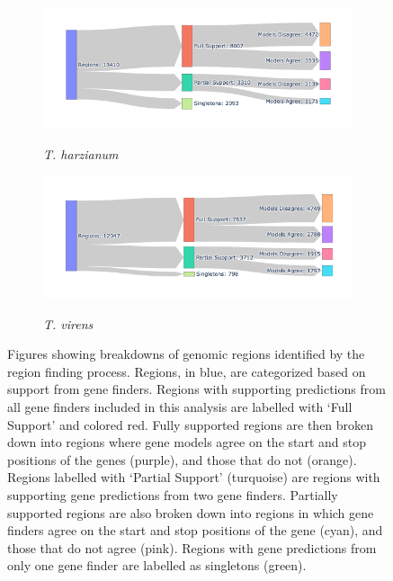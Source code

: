 \begin{figure}
  \ContinuedFloat
  \centering
  \begin{subfigure}{0.9\textwidth}
    \includegraphics[width=\textwidth]{figures/t-harzianum-region-breakdown.png}
    \label{fig:t-harzianum-regions}
    \caption{\textit{T. harzianum}}
  \end{subfigure}
  \begin{subfigure}{0.9\textwidth}
    \includegraphics[width=\textwidth]{figures/t-virens-region-breakdown.png}
    \label{fig:t-virens-regions}
    \caption{\textit{T. virens}}
  \end{subfigure}
  \caption[Breakdown of identified regions]{Figures showing breakdowns
    of genomic regions identified by the region finding
    process. Regions, in blue, are categorized based on support from
    gene finders. Regions with supporting predictions from all gene
    finders included in this analysis are labelled with `Full Support'
    and colored red. Fully supported regions are then broken down into
    regions where gene models agree on the start and stop positions of
    the genes (purple), and those that do not (orange). Regions
    labelled with `Partial Support' (turquoise) are regions with
    supporting gene predictions from two gene finders. Partially
    supported regions are also broken down into regions in which gene
    finders agree on the start and stop positions of the gene (cyan),
    and those that do not agree (pink). Regions with gene predictions
    from only one gene finder are labelled as singletons (green).}
  \label{fig:regions-sankey}
\end{figure}

